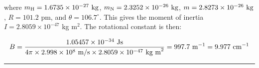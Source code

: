 \begin{itemize}
where $m_\textnormal{H} = 1.6735\times 10^{-27}\textnormal{ kg}$, $m_\textnormal{N} = 2.3252\times 10^{-26}\textnormal{ kg}$, $m = 2.8273\times 10^{-26}\textnormal{ kg}$, $R = 101.2$ pm, and $\theta = 106.7^\circ$. This gives the moment of inertia $I = 2.8059\times 10^{-47}$ kg m$^2$. The rotational constant is then:

$$B = \frac{1.05457\times 10^{-34}\textnormal{ Js}}{4\pi\times 2.998\times 10^8\textnormal{ m/s}\times 2.8059\times 10^{-47}\textnormal{ kg m}^2} = 997.7\textnormal{ m}^{-1} = 9.977\textnormal{ cm}^{-1}$$



\end{itemize}

\hrule\vspace{0.5cm}



